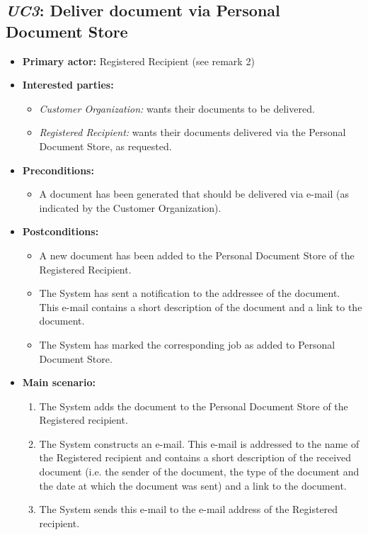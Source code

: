 \documentclass[a4paper,10pt]{article}
\begin{document}
\subsection{\emph{UC3}: Deliver document via Personal Document Store}
\begin{itemize}
	\item \textbf{Primary actor:} Registered Recipient (see remark 2)
	\item \textbf{Interested parties:} 
	\begin{itemize}
		\item \textit{Customer Organization:} wants their documents to be delivered.
        \item \textit{Registered Recipient:} wants their documents delivered via the Personal Document Store, as requested.
	\end{itemize}
	
	\item \textbf{Preconditions:}
	\begin{itemize}
		\item A document has been generated that should be delivered via e-mail (as indicated by the Customer Organization).
	\end{itemize}
	
	\item \textbf{Postconditions:}
	\begin{itemize}
		\item A new document has been added to the Personal Document Store of the Registered Recipient.
		\item The System has sent a notification to the addressee of the document. This e-mail contains a short description of the document and a link to the document.
		\item The System has marked the corresponding job as added to Personal Document Store.
	\end{itemize}
	
	\item \textbf{Main scenario:} 
	\begin{enumerate}
		\item The System adds the document to the Personal Document Store of the Registered recipient.
		\item The System constructs an e-mail. This e-mail is addressed to the name of the Registered recipient and contains a short description of the received document (i.e. the sender of the document, the type of the document and the date at which the document was sent) and a link to the document.
		\item The System sends this e-mail to the e-mail address of the Registered recipient.
	\end{enumerate}
	

\end{itemize}
\end{document}
